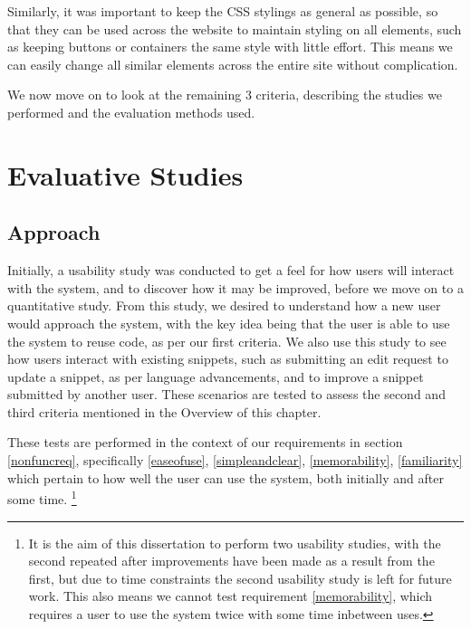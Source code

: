 Similarly, it was important to keep the CSS stylings as general as possible, so that they can be used across the website to maintain styling on all elements, such as keeping buttons or containers the same style with little effort.
This means we can easily change all similar elements across the entire site without complication.

We now move on to look at the remaining 3 criteria, describing the studies we performed and the evaluation methods used.

\section{Evaluative Studies}
\subsection{Approach} \label{approach}
Initially, a usability study was conducted to get a feel for how users will interact with the system, and to discover how it may be improved, before we move on to a quantitative study. 
From this study, we desired to understand how a new user would approach the system, with the key idea being that the user is able to use the system to reuse code, as per our first criteria.
We also use this study to see how users interact with existing snippets, such as submitting an edit request to update a snippet, as per language advancements, and to improve a snippet submitted by another user.
These scenarios are tested to assess the second and third criteria mentioned in the Overview of this chapter. 

These tests are performed in the context of our requirements in section \ref{nonfuncreq}, specifically \ref{easeofuse}, \ref{simpleandclear}, \ref{memorability}, \ref{familiarity} which pertain to how well the user can use the system, both initially and after some time.
\footnote{It is the aim of this dissertation to perform two usability studies, with the second repeated after improvements have been made as a result from the first, but due to time constraints the second usability study is left for future work.
This also means we cannot test requirement \ref{memorability}, which requires a user to use the system twice with some time inbetween uses.}

